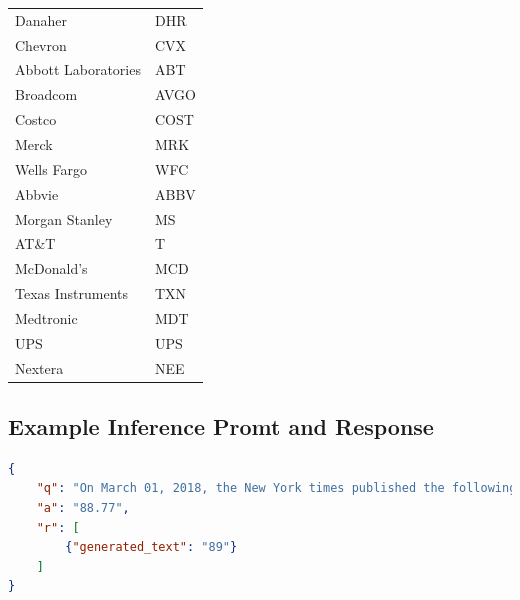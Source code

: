 \documentclass[conference]{IEEEtran}
\begin{document}
\begin{singlespace}
\begin{Center}
\begin{table}[H]
\begin{tabular}{|l|l|}
    Danaher & DHR \\
    Chevron & CVX \\
    Abbott Laboratories & ABT \\
    Broadcom & AVGO \\
    Costco & COST \\
    Merck & MRK \\
    Wells Fargo & WFC \\
    Abbvie & ABBV \\
    Morgan Stanley & MS \\
    AT\&T & T \\
    McDonald's & MCD \\
    Texas Instruments & TXN \\
    Medtronic & MDT \\
    UPS & UPS \\
    Nextera & NEE \\
    \hline
\end{tabular}
\label{table:stockSources}
\end{table}

\subsection{Example Inference Promt and Response}
\label{Examples}
\begin{lstlisting}[language=json,firstnumber=1]
{
	"q": "On March 01, 2018, the New York times published the following article regarding Walmart(Ticker: WMT) from their Business news desk. Headline: Walmart to Raise Age to Buy Guns and Ammunition to 21. Lead paragraph: Walmart, the largest retailer in the United States, said Wednesday evening that it would stop selling guns and ammunition to anyone under 21 years of age and remove from its stores all toys and airsoft rifles that resemble assault-style weapons. When the news of this was released, past stock prices were: $92.77, $92.89, $93.12, $91.52, $90.01, $89.08. After this news was announced, the following day's price was: $",
	"a": "88.77",
	"r": [
		{"generated_text": "89"}
	]
}
\end{lstlisting}
\end{Center}
\end{singlespace}
\end{document}
